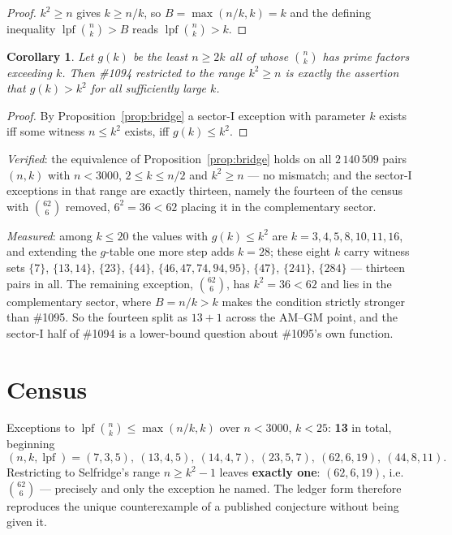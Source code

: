 \documentclass[11pt]{article}
\newtheorem{corollary}[theorem]{Corollary}
\DeclareMathOperator{\lpf}{lpf}
\begin{document}
\begin{proof}
$k^{2}\ge n$ gives $k\ge n/k$, so $B=\max(n/k,k)=k$ and the defining inequality
$\lpf\binom nk>B$ reads $\lpf\binom nk>k$.
\end{proof}

\begin{corollary}\label{cor:bridge}
Let $g(k)$ be the least $n\ge2k$ all of whose $\binom nk$ has prime factors exceeding $k$.
Then \textup{\#1094} restricted to the range $k^{2}\ge n$ is exactly the assertion that
$g(k)>k^{2}$ for all sufficiently large $k$.
\end{corollary}

\begin{proof}
By Proposition~\ref{prop:bridge} a sector-I exception with parameter $k$ exists iff some
witness $n\le k^{2}$ exists, iff $g(k)\le k^{2}$.
\end{proof}

\emph{Verified}: the equivalence of Proposition~\ref{prop:bridge} holds on all $2\,140\,509$
pairs $(n,k)$ with $n<3000$, $2\le k\le n/2$ and $k^{2}\ge n$ --- no mismatch; and the
sector-I exceptions in that range are exactly thirteen, namely the fourteen of the census with
$\binom{62}{6}$ removed, $6^{2}=36<62$ placing it in the complementary sector.

\emph{Measured}: among $k\le20$ the values with $g(k)\le k^{2}$ are $k=3,4,5,8,10,11,16$,
and extending the $g$-table one more step adds $k=28$; these eight $k$ carry witness sets
$\{7\}$, $\{13,14\}$, $\{23\}$, $\{44\}$, $\{46,47,74,94,95\}$, $\{47\}$, $\{241\}$,
$\{284\}$ --- thirteen pairs in all.  The remaining exception, $\binom{62}{6}$, has
$k^{2}=36<62$ and lies in the complementary sector, where $B=n/k>k$ makes the condition
strictly stronger than \#1095.  So the fourteen split as $13+1$ across the AM--GM point, and
the sector-I half of \#1094 is a lower-bound question about \#1095's own function.

\section{Census}
Exceptions to $\lpf\binom nk\le\max(n/k,k)$ over $n<3000$, $k<25$: \textbf{13} in total,
beginning
\[
  (n,k,\lpf)=(7,3,5),\ (13,4,5),\ (14,4,7),\ (23,5,7),\ (62,6,19),\ (44,8,11).
\]
Restricting to Selfridge's range $n\ge k^{2}-1$ leaves \textbf{exactly one}: $(62,6,19)$,
i.e.\ $\binom{62}{6}$ --- precisely and only the exception he named.  The ledger form
therefore reproduces the unique counterexample of a published conjecture without being given
it.
\end{document}
